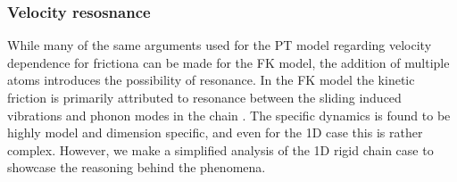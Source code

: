 





\subsubsection{Velocity resosnance} %
While many of the same arguments used for the \acrshort{PT} model regarding velocity dependence for frictiona can be made for the \acrshort{FK} model, the addition of multiple atoms introduces the possibility of resonance. In the \acrshort{FK} model the kinetic friction is primarily attributed to resonance between the sliding induced vibrations and phonon modes in the chain \cite{FK2D}. The specific dynamics is found to be highly model and dimension specific, and even for the 1D case this is rather complex. However, we make a simplified analysis of the 1D rigid chain case to showcase the reasoning behind the phenomena.

